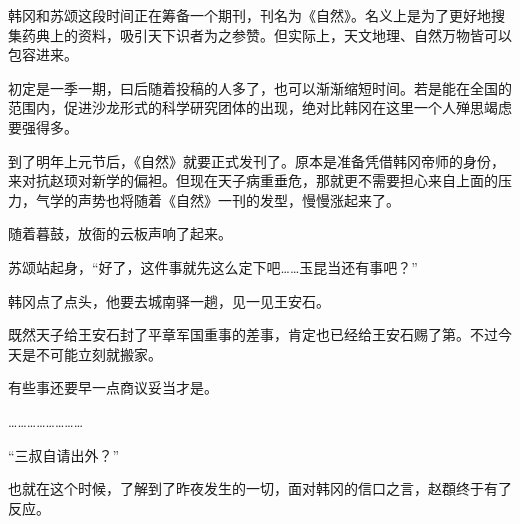 韩冈和苏颂这段时间正在筹备一个期刊，刊名为《自然》。名义上是为了更好地搜集药典上的资料，吸引天下识者为之参赞。但实际上，天文地理、自然万物皆可以包容进来。

初定是一季一期，曰后随着投稿的人多了，也可以渐渐缩短时间。若是能在全国的范围内，促进沙龙形式的科学研究团体的出现，绝对比韩冈在这里一个人殚思竭虑要强得多。

到了明年上元节后，《自然》就要正式发刊了。原本是准备凭借韩冈帝师的身份，来对抗赵顼对新学的偏袒。但现在天子病重垂危，那就更不需要担心来自上面的压力，气学的声势也将随着《自然》一刊的发型，慢慢涨起来了。

随着暮鼓，放衙的云板声响了起来。

苏颂站起身，“好了，这件事就先这么定下吧……玉昆当还有事吧？”

韩冈点了点头，他要去城南驿一趟，见一见王安石。

既然天子给王安石封了平章军国重事的差事，肯定也已经给王安石赐了第。不过今天是不可能立刻就搬家。

有些事还要早一点商议妥当才是。

……………………

“三叔自请出外？”

也就在这个时候，了解到了昨夜发生的一切，面对韩冈的信口之言，赵頵终于有了反应。

